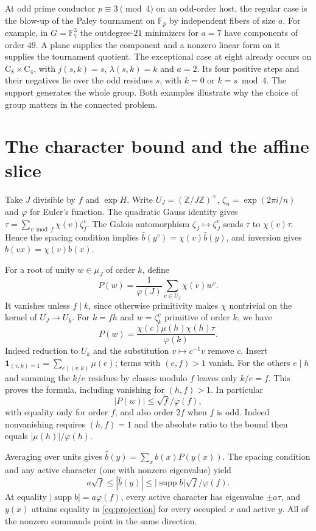 \documentclass[11pt,letterpaper]{article}
\newcommand{\Z}{\mathbb Z}\newcommand{\F}{\mathbb F}\newcommand{\E}{\mathbb E}
\newcommand{\supp}{\operatorname{supp}}\newcommand{\ord}{\operatorname{ord}}
\newcommand{\Cyc}{\mathrm C}
\newcommand{\one}{\mathbf 1}
\newcommand{\z}{\zeta}
\begin{document}
At odd prime conductor $p\equiv3\pmod4$ on an odd-order host, the regular case is the blow-up of the Paley tournament on $\F_p$ by independent fibers of size $a$. For example, in $G=\F_7^3$ the outdegree-$21$ minimizers for $a=7$ have components of order $49$. A plane supplies the component and a nonzero linear form on it supplies the tournament quotient. The exceptional case at eight already occurs on $\Cyc_8\times\Cyc_4$, with $j(s,k)=s$, $\lambda(s,k)=k$ and $a=2$. Its four positive steps and their negatives lie over the odd residues $s$, with $k=0$ or $k=s\bmod4$. The support generates the whole group. Both examples illustrate why the choice of group matters in the connected problem.

\section{The character bound and the affine slice}\label{sec:fourier}
Take $J$ divisible by $f$ and $\exp H$. Write $U_J=(\Z/J\Z)^\times$, $\z_n=\exp(2\pi i/n)$ and $\varphi$ for Euler's function. The quadratic Gauss identity gives $\tau=\sum_{v\bmod f}\chi(v)\z_f^v$. The Galois automorphism $\z_J\mapsto\z_J^v$ sends $\tau$ to $\chi(v)\tau$. Hence the spacing condition implies $\widehat b(y^v)=\chi(v)\widehat b(y)$, and inversion gives $b(vx)=\chi(v)b(x)$.

For a root of unity $w\in\mu_J$ of order $k$, define
\[
 P(w)=\frac{1}{\varphi(J)}\sum_{v\in U_J}\chi(v)w^v .
\]
It vanishes unless $f\mid k$, since otherwise primitivity makes $\chi$ nontrivial on the kernel of $U_J\to U_k$. For $k=fh$ and $w=\z_k^c$ primitive of order $k$, we have
\[
 P(w)=\frac{\chi(c)\mu(h)\chi(h)\tau}{\varphi(k)}.
\]
Indeed reduction to $U_k$ and the substitution $v\mapsto c^{-1}v$ remove $c$. Insert $\one_{(v,k)=1}=\sum_{e\mid(v,k)}\mu(e)$; terms with $(e,f)>1$ vanish. For the others $e\mid h$ and summing the $k/e$ residues by classes modulo $f$ leaves only $k/e=f$. This proves the formula, including vanishing for $(h,f)>1$. In particular
\begin{equation}\label{eq:projection}
 |P(w)|\le\sqrt f/\varphi(f),
\end{equation}
with equality only for order $f$, and also order $2f$ when $f$ is odd. Indeed nonvanishing requires $(h,f)=1$ and the absolute ratio to the bound then equals $|\mu(h)|/\varphi(h)$.

Averaging over units gives $\widehat b(y)=\sum_x b(x)P(y(x))$. The spacing condition and any active character (one with nonzero eigenvalue) yield
\[
 a\sqrt f\le |\widehat b(y)|\le |\supp b|\sqrt f/\varphi(f).
\]
At equality $|\supp b|=a\varphi(f)$, every active character has eigenvalue $\pm a\tau$, and $y(x)$ attains equality in \eqref{eq:projection} for every occupied $x$ and active $y$. All of the nonzero summands point in the same direction.
\end{document}
